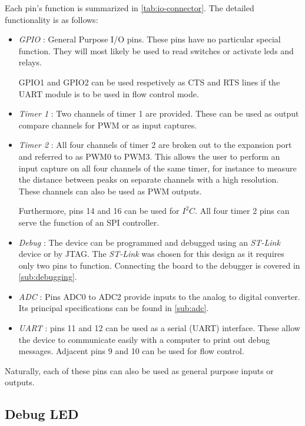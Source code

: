 Each pin's function is summarized in \autoref{tab:io-connector}. The detailed
functionality is as follows:

\begin{itemize}
  \item \emph{GPIO} : General Purpose I/O pins. These pins have no particular
    special function. They will most likely be used to read switches or activate
    leds and relays.
    
    GPIO1 and GPIO2 can be used respetively as CTS and RTS lines if the UART
    module is to be used in flow control mode.
  \item \emph{Timer 1} : Two channels of timer 1 are provided. These can be used
    as output compare channels for \ac{PWM} or as input captures.
  \item \emph{Timer 2} : All four channels of timer 2 are broken out to the
    expansion port and referred to as PWM0 to PWM3.  This allows the user to
    perform an input capture on all four channels of the same timer, for
    instance to measure the distance between peaks on separate channels with
    a high resolution. These channels can also be used as \ac{PWM} outputs.

    Furthermore, pins 14 and 16 can be used for $I^{2}C$. All four timer 2 pins
    can serve the function of an SPI controller.
  \item \emph{Debug} : The device can be programmed and debugged using an
    \emph{ST-Link} device or by JTAG. The \emph{ST-Link} was chosen for this
    design as it requires only two pins to function. Connecting the board to the
    debugger is covered in \autoref{sub:debugging}.
  \item \emph{ADC} : Pins ADC0 to ADC2 provide inputs to the analog to digital
    converter. Its principal specifications can be found in \autoref{sub:adc}.
  \item \emph{UART} : pins 11 and 12 can be used as a serial (UART) interface.
    These allow the device to communicate easily with a computer to print out
    debug messages. Adjacent pins 9 and 10 can be used for flow control.
\end{itemize}

Naturally, each of these pins can also be used as general purpose inputs or
outputs.

\subsection{Debug LED}

